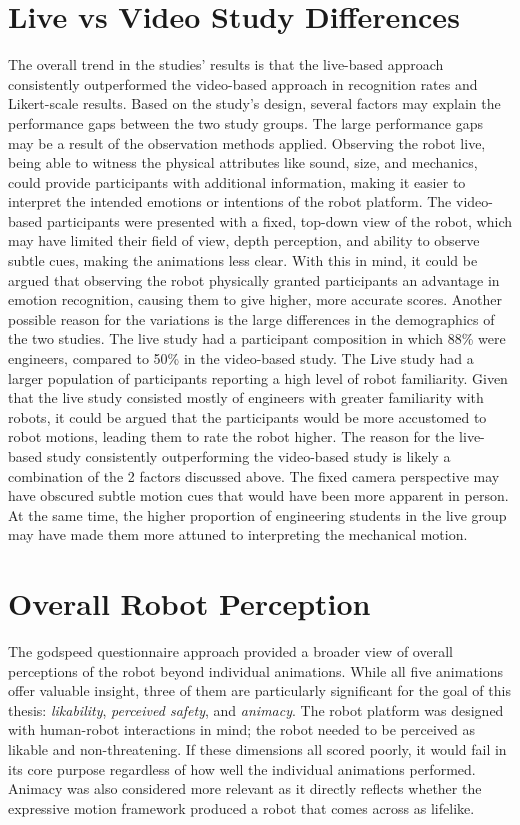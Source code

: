 \section{Live vs Video Study Differences}
The overall trend in the studies' results is that the live-based approach consistently outperformed the video-based approach in recognition rates and Likert-scale results. Based on the study's design, several factors may explain the performance gaps between the two study groups.
The large performance gaps may be a result of the observation methods applied. Observing the robot live, being able to witness the physical attributes like sound, size, and mechanics, could provide participants with additional information, making it easier to interpret the intended emotions or intentions of the robot platform. The video-based participants were presented with a fixed, top-down view of the robot, which may have limited their field of view, depth perception, and ability to observe subtle cues, making the animations less clear. With this in mind, it could be argued that observing the robot physically granted participants an advantage in emotion recognition, causing them to give higher, more accurate scores. 
Another possible reason for the variations is the large differences in the demographics of the two studies. The live study had a participant composition in which 88\% were engineers, compared to 50\% in the video-based study. The Live study had a larger population of participants reporting a high level of robot familiarity. Given that the live study consisted mostly of engineers with greater familiarity with robots, it could be argued that the participants would be more accustomed to robot motions, leading them to rate the robot higher.
The reason for the live-based study consistently outperforming the video-based study is likely a combination of the 2 factors discussed above. The fixed camera perspective may have obscured subtle motion cues that would have been more apparent in person. At the same time, the higher proportion of engineering students in the live group may have made them more attuned to interpreting the mechanical motion.

\section{Overall Robot Perception}
The godspeed questionnaire approach provided a broader view of overall perceptions of the robot beyond individual animations. While all five animations offer valuable insight, three of them are particularly significant for the goal of this thesis:  \textit{likability}, \textit{perceived safety}, and \textit{animacy}. The robot platform was designed with human-robot interactions in mind; the robot needed to be perceived as likable and non-threatening. If these dimensions all scored poorly, it would fail in its core purpose regardless of how well the individual animations performed. Animacy was also considered more relevant as it directly reflects whether the expressive motion framework produced a robot that comes across as lifelike.

